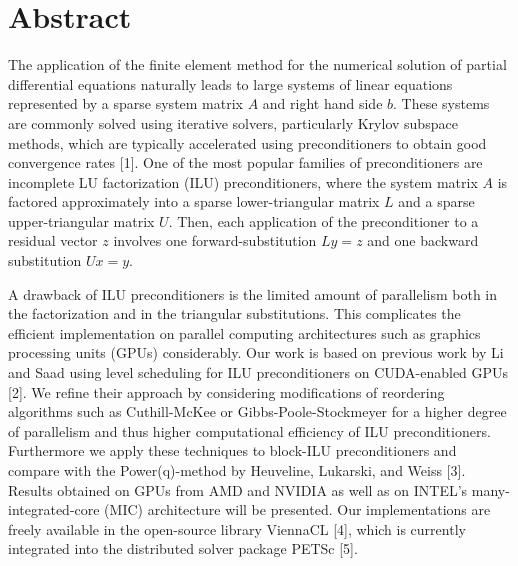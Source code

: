 \documentclass[article, A4, 11pt]{llncs}%
\begin{document}
\section*{Abstract}
The application of the finite element method for the numerical solution of partial differential equations naturally leads to
large systems of linear equations represented by a sparse system matrix $A$ and right hand side $b$. These systems are commonly solved using iterative solvers, particularly Krylov subspace methods, which are typically accelerated using preconditioners to obtain good convergence rates [1]. One of the most popular families of preconditioners are incomplete LU factorization (ILU) preconditioners, where the system matrix $A$ is factored approximately into a sparse lower-triangular matrix $L$ and a sparse upper-triangular matrix $U$. Then, each application of the preconditioner to a residual vector $z$ involves one forward-substitution $Ly = z$ and one backward substitution $Ux = y$.

A drawback of ILU preconditioners is the limited amount of parallelism both in the factorization and in the triangular substitutions. This complicates the efficient implementation on parallel computing architectures such as graphics processing units (GPUs) considerably. Our work is based on previous work by Li and Saad using level scheduling for ILU preconditioners on CUDA-enabled GPUs [2]. We refine their approach by considering modifications of reordering algorithms such as Cuthill-McKee or Gibbs-Poole-Stockmeyer for a higher degree of parallelism and thus higher computational efficiency of ILU preconditioners. Furthermore we apply these techniques to block-ILU preconditioners and compare with the Power(q)-method by Heuveline, Lukarski, and Weiss [3]. Results obtained on GPUs from AMD and NVIDIA as well as on INTEL's many-integrated-core (MIC) architecture will be presented. Our implementations are freely available in the open-source library ViennaCL [4], which is currently integrated into the distributed solver package PETSc [5].
\end{document}
